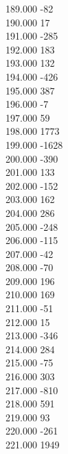{ 189.000	-82 \\
 190.000	17 \\
 191.000	-285 \\
 192.000	183 \\
 193.000	132 \\
 194.000	-426 \\
 195.000	387 \\
 196.000	-7 \\
 197.000	59 \\
 198.000	1773 \\
 199.000	-1628 \\
 200.000	-390 \\
 201.000	133 \\
 202.000	-152 \\
 203.000	162 \\
 204.000	286 \\
 205.000	-248 \\
 206.000	-115 \\
 207.000	-42 \\
 208.000	-70 \\
 209.000	196 \\
 210.000	169 \\
 211.000	-51 \\
 212.000	15 \\
 213.000	-346 \\
 214.000	284 \\
 215.000	-75 \\
 216.000	303 \\
 217.000	-810 \\
 218.000	591 \\
 219.000	93 \\
 220.000	-261 \\
 221.000	1949 \\
}
